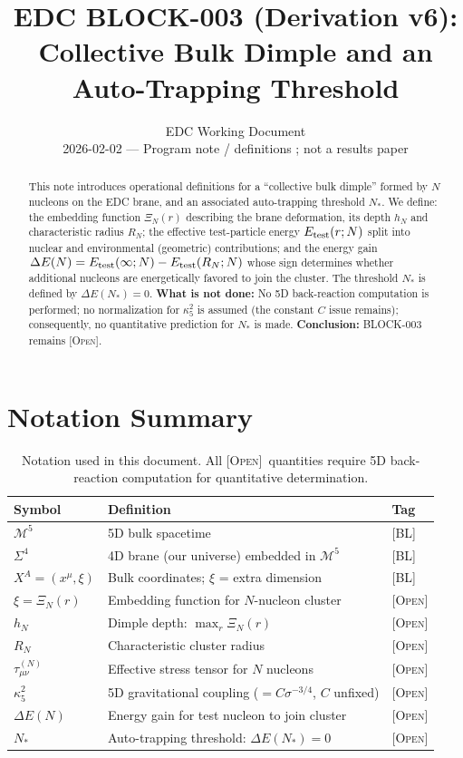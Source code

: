 \documentclass[11pt,a4paper]{article}
\title{\textbf{EDC BLOCK-003 (Derivation v6):}\\[0.3em]
Collective Bulk Dimple and an Auto-Trapping Threshold}
\author{EDC Working Document\\[0.5em]
\small 2026-02-02 --- Program note / definitions \Open; not a results paper}
\date{}
\newcommand{\BL}{\textsc{[BL]}}
\newcommand{\Open}{\textsc{[Open]}}
\begin{document}
\maketitle

\begin{abstract}
This note introduces operational definitions for a ``collective bulk dimple''
formed by $N$ nucleons on the EDC brane, and an associated auto-trapping
threshold $N_*$. We define: the embedding function $\Xi_N(r)$ describing the
brane deformation, its depth $h_N$ and characteristic radius $R_N$; the
effective test-particle energy $E_{\rm test}(r;N)$ split into nuclear and
environmental (geometric) contributions; and the energy gain
$\Delta E(N) = E_{\rm test}(\infty;N) - E_{\rm test}(R_N;N)$ whose sign
determines whether additional nucleons are energetically favored to join
the cluster. The threshold $N_*$ is defined by $\Delta E(N_*) = 0$.
\textbf{What is not done:} No 5D back-reaction computation is performed;
no normalization for $\kappa_5^2$ is assumed (the constant $C$ issue remains);
consequently, no quantitative prediction for $N_*$ is made.
\textbf{Conclusion:} BLOCK-003 remains \Open.
\end{abstract}

\tableofcontents
\newpage

\section{Notation Summary}

\begin{table}[h]
\centering
\begin{tabular}{lll}
\toprule
\textbf{Symbol} & \textbf{Definition} & \textbf{Tag} \\
\midrule
$\mathcal{M}^5$ & 5D bulk spacetime & \BL \\
$\Sigma^4$ & 4D brane (our universe) embedded in $\mathcal{M}^5$ & \BL \\
$X^A = (x^\mu, \xi)$ & Bulk coordinates; $\xi$ = extra dimension & \BL \\
$\xi = \Xi_N(r)$ & Embedding function for $N$-nucleon cluster & \Open \\
$h_N$ & Dimple depth: $\max_r \Xi_N(r)$ & \Open \\
$R_N$ & Characteristic cluster radius & \Open \\
$\tau_{\mu\nu}^{(N)}$ & Effective stress tensor for $N$ nucleons & \Open \\
$\kappa_5^2$ & 5D gravitational coupling ($= C \sigma^{-3/4}$, $C$ unfixed) & \Open \\
$\Delta E(N)$ & Energy gain for test nucleon to join cluster & \Open \\
$N_*$ & Auto-trapping threshold: $\Delta E(N_*) = 0$ & \Open \\
\bottomrule
\end{tabular}
\caption{Notation used in this document. All \Open\ quantities require
5D back-reaction computation for quantitative determination.}
\label{tab:notation}
\end{table}
\end{document}
